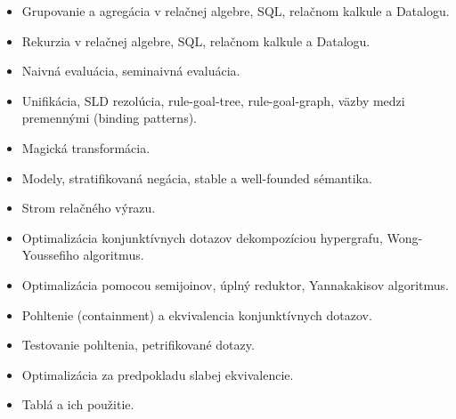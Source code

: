 \documentclass[a4paper]{report}
\begin{document}
\begin{zadanie}
\begin{itemize}
 \item Grupovanie a agregácia v relačnej algebre, SQL, relačnom kalkule a Datalogu.
 \item Rekurzia v relačnej algebre, SQL, relačnom kalkule a Datalogu.
\end{itemize}
\end{zadanie}

\begin{zadanie}
\begin{itemize}
 \item Naivná evaluácia, seminaivná evaluácia.
 \item Unifikácia, SLD rezolúcia, rule-goal-tree, rule-goal-graph, väzby medzi premennými (binding patterns).
 \item Magická transformácia.
 \item Modely, stratifikovaná negácia, stable a well-founded sémantika.
\end{itemize}
\end{zadanie}

\begin{zadanie}
\begin{itemize}
 \item Strom relačného výrazu.
 \item Optimalizácia konjunktívnych dotazov dekompozíciou hypergrafu, Wong-Youssefiho algoritmus.
 \item Optimalizácia pomocou semijoinov, úplný reduktor, Yannakakisov algoritmus.
\end{itemize}
\end{zadanie}

\begin{zadanie}
\begin{itemize}
 \item Pohltenie (containment) a ekvivalencia konjunktívnych dotazov.
 \item Testovanie pohltenia, petrifikované dotazy.
 \item Optimalizácia za predpokladu slabej ekvivalencie.
 \item Tablá a ich použitie.
\end{itemize}
\end{zadanie}
\end{document}
